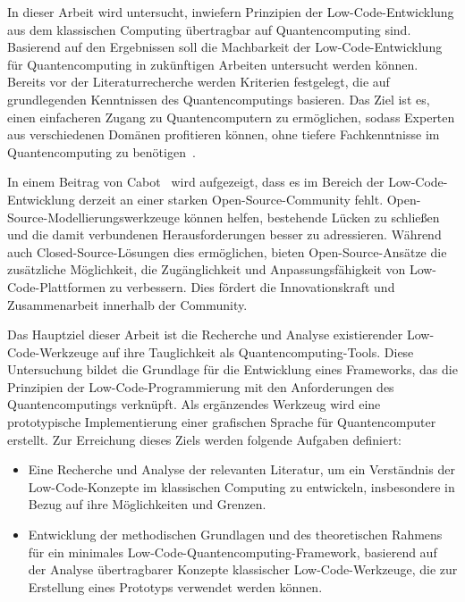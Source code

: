 In dieser Arbeit wird untersucht, inwiefern Prinzipien der Low-Code-Entwicklung aus dem
klassischen Computing übertragbar auf Quantencomputing sind. Basierend auf den Ergebnissen 
soll die Machbarkeit der Low-Code-Entwicklung für Quantencomputing in zukünftigen Arbeiten untersucht werden können. 
Bereits vor der Literaturrecherche werden Kriterien festgelegt, die auf grundlegenden Kenntnissen des Quantencomputings 
basieren. Das Ziel ist es, einen einfacheren Zugang zu Quantencomputern zu ermöglichen, sodass 
Experten aus verschiedenen Domänen profitieren können, ohne tiefere Fachkenntnisse 
im Quantencomputing zu benötigen~\cite{Motta2022}.

In einem Beitrag von Cabot~\cite{Cabot_2020} wird aufgezeigt, dass es im Bereich der 
Low-Code-Entwicklung derzeit an einer starken Open-Source-Community fehlt. 
Open-Source-Modellierungswerkzeuge können helfen, bestehende Lücken zu schließen 
und die damit verbundenen Herausforderungen besser zu adressieren. Während auch 
Closed-Source-Lösungen dies ermöglichen, bieten Open-Source-Ansätze die zusätzliche 
Möglichkeit, die Zugänglichkeit und Anpassungsfähigkeit von Low-Code-Plattformen zu verbessern. 
Dies fördert die Innovationskraft und Zusammenarbeit innerhalb der Community.

Das Hauptziel dieser Arbeit ist die Recherche und Analyse existierender Low-Code-Werkzeuge 
auf ihre Tauglichkeit als Quantencomputing-Tools. Diese Untersuchung bildet die Grundlage 
für die Entwicklung eines Frameworks, das die Prinzipien der Low-Code-Programmierung 
mit den Anforderungen des Quantencomputings verknüpft. Als ergänzendes Werkzeug wird 
eine prototypische Implementierung einer grafischen Sprache für Quantencomputer erstellt. 
Zur Erreichung dieses Ziels werden folgende Aufgaben definiert:

\begin{itemize}
\item
  Eine Recherche und Analyse der relevanten Literatur, um ein
  Verständnis der Low-Code-Konzepte im klassischen Computing zu
  entwickeln, insbesondere in Bezug auf ihre Möglichkeiten und Grenzen.
\item
  Entwicklung der methodischen Grundlagen und des theoretischen Rahmens 
  für ein minimales Low-Code-Quantencomputing-Framework, basierend auf der 
  Analyse übertragbarer Konzepte klassischer Low-Code-Werkzeuge, die zur 
  Erstellung eines Prototyps verwendet werden können.
\end{itemize}



